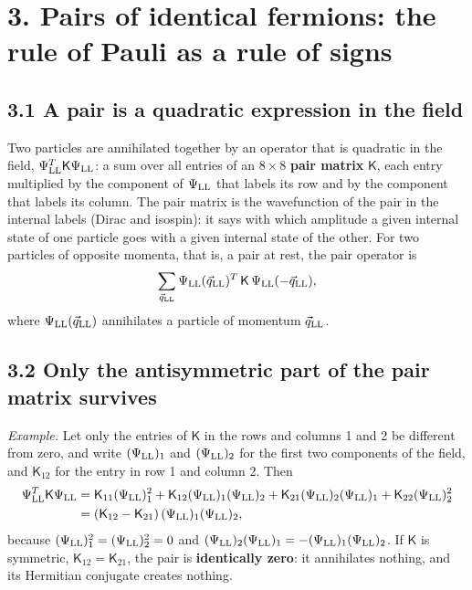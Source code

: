 \documentclass[
  10pt,
]{article}
\begin{document}
\hypertarget{pairs-of-identical-fermions-the-rule-of-pauli-as-a-rule-of-signs}{%
\section{3. Pairs of identical fermions: the rule of Pauli as a rule of
signs}\label{pairs-of-identical-fermions-the-rule-of-pauli-as-a-rule-of-signs}}

\hypertarget{a-pair-is-a-quadratic-expression-in-the-field}{%
\subsection{3.1 A pair is a quadratic expression in the
field}\label{a-pair-is-a-quadratic-expression-in-the-field}}

Two particles are annihilated together by an operator that is quadratic
in the field, \(\Psi^T_{\rm LL}\mathsf K\Psi_{\rm LL}\): a sum over all
entries of an \(8\times8\) \textbf{pair matrix} \(\mathsf K\), each
entry multiplied by the component of \(\Psi_{\rm LL}\) that labels its
row and by the component that labels its column. The pair matrix is the
wavefunction of the pair in the internal labels (Dirac and isospin): it
says with which amplitude a given internal state of one particle goes
with a given internal state of the other. For two particles of opposite
momenta, that is, a pair at rest, the pair operator is
\[\sum_{\vec q_{\rm LL}}\Psi_{\rm LL}(\vec q_{\rm LL})^T\,\mathsf K\,\Psi_{\rm LL}(-\vec q_{\rm LL}),\]
where \(\Psi_{\rm LL}(\vec q_{\rm LL})\) annihilates a particle of
momentum \(\vec q_{\rm LL}\).

\hypertarget{only-the-antisymmetric-part-of-the-pair-matrix-survives}{%
\subsection{3.2 Only the antisymmetric part of the pair matrix
survives}\label{only-the-antisymmetric-part-of-the-pair-matrix-survives}}

\emph{Example.} Let only the entries of \(\mathsf K\) in the rows and
columns 1 and 2 be different from zero, and write \((\Psi_{\rm LL})_1\)
and \((\Psi_{\rm LL})_2\) for the first two components of the field, and
\(\mathsf K_{12}\) for the entry in row 1 and column 2. Then
\[\begin{aligned}\Psi^T_{\rm LL}\mathsf K\Psi_{\rm LL}&=\mathsf K_{11}(\Psi_{\rm LL})_1^2+\mathsf K_{12}(\Psi_{\rm LL})_1(\Psi_{\rm LL})_2+\mathsf K_{21}(\Psi_{\rm LL})_2(\Psi_{\rm LL})_1+\mathsf K_{22}(\Psi_{\rm LL})_2^2\\&=(\mathsf K_{12}-\mathsf K_{21})\,(\Psi_{\rm LL})_1(\Psi_{\rm LL})_2 ,\end{aligned}\]
because \((\Psi_{\rm LL})_1^2=(\Psi_{\rm LL})_2^2=0\) and
\((\Psi_{\rm LL})_2(\Psi_{\rm LL})_1=-(\Psi_{\rm LL})_1(\Psi_{\rm LL})_2\).
If \(\mathsf K\) is symmetric, \(\mathsf K_{12}=\mathsf K_{21}\), the
pair is \textbf{identically zero}: it annihilates nothing, and its
Hermitian conjugate creates nothing.
\end{document}
